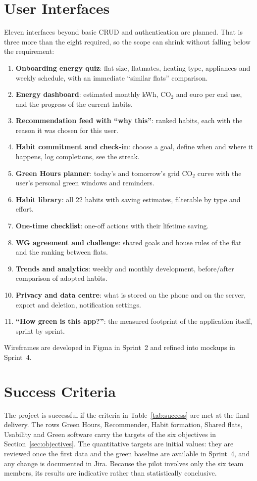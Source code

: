 \documentclass[conference]{IEEEtran}
\newcommand{\COtwo}{CO$_2$}
\begin{document}
\section{User Interfaces}
\label{sec:ui}
Eleven interfaces beyond basic CRUD and authentication are planned. That is three more than the eight required, so the scope can shrink without falling below the requirement:
\begin{enumerate}
\item \textbf{Onboarding energy quiz}: flat size, flatmates, heating type, appliances and weekly schedule, with an immediate ``similar flats'' comparison.
\item \textbf{Energy dashboard}: estimated monthly kWh, \COtwo{} and euro per end use, and the progress of the current habits.
\item \textbf{Recommendation feed with ``why this''}: ranked habits, each with the reason it was chosen for this user.
\item \textbf{Habit commitment and check-in}: choose a goal, define when and where it happens, log completions, see the streak.
\item \textbf{Green Hours planner}: today's and tomorrow's grid \COtwo{} curve with the user's personal green windows and reminders.
\item \textbf{Habit library}: all 22 habits with saving estimates, filterable by type and effort.
\item \textbf{One-time checklist}: one-off actions with their lifetime saving.
\item \textbf{WG agreement and challenge}: shared goals and house rules of the flat and the ranking between flats.
\item \textbf{Trends and analytics}: weekly and monthly development, before/after comparison of adopted habits.
\item \textbf{Privacy and data centre}: what is stored on the phone and on the server, export and deletion, notification settings.
\item \textbf{``How green is this app?''}: the measured footprint of the application itself, sprint by sprint.
\end{enumerate}
Wireframes are developed in Figma in Sprint~2 and refined into mockups in Sprint~4.

\section{Success Criteria}
\label{sec:success}
The project is successful if the criteria in Table~\ref{tab:success} are met at the final delivery. The rows Green Hours, Recommender, Habit formation, Shared flats, Usability and Green software carry the targets of the six objectives in Section~\ref{sec:objectives}. The quantitative targets are initial values: they are reviewed once the first data and the green baseline are available in Sprint~4, and any change is documented in Jira. Because the pilot involves only the six team members, its results are indicative rather than statistically conclusive.
\end{document}
